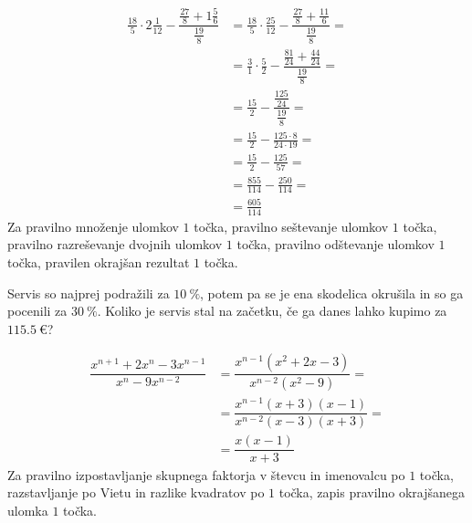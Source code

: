 \documentclass[addpoints]{exam}
\begin{document}
\begin{questions}
\begin{parts}
        \begin{solution}[7cm]
            \begin{align*} 
                \frac{18}{5}\cdot 2\frac{1}{12}-\dfrac{\frac{27}{8}+1\frac{5}{6}}{\frac{19}{8}}&=\frac{18}{5}\cdot \frac{25}{12}-\dfrac{\frac{27}{8}+\frac{11}{6}}{\frac{19}{8}}= \\
                                                                                            &= \frac{3}{1}\cdot \frac{5}{2}-\dfrac{\frac{81}{24}+\frac{44}{24}}{\frac{19}{8}}= \\
                                                                                            &=\frac{15}{2}-\dfrac{\frac{125}{24}}{\frac{19}{8}}= \\
                                                                                            &=\frac{15}{2}-\frac{125\cdot 8}{24\cdot 19}= \\
                                                                                            &=\frac{15}{2}-\frac{125}{57}= \\
                                                                                            &=\frac{855}{114}-\frac{250}{114}= \\
                                                                                            &=\frac{605}{114}
            \end{align*}
            Za pravilno množenje ulomkov $1$ točka, pravilno seštevanje ulomkov $1$ točka, pravilno razreševanje dvojnih ulomkov $1$ točka, pravilno odštevanje ulomkov $1$ točka, pravilen okrajšan rezultat $1$ točka.
        \end{solution}


    \end{parts}



        \question[3]
        Servis so najprej podražili za $10~\%$, potem pa se je ena skodelica okrušila in so
        ga pocenili za $30~\%$. Koliko je servis stal na začetku, če ga danes lahko kupimo za $115.5~\euro$?

        \begin{solution}[3cm]
            \begin{align*}
                \dfrac{x^{n+1}+2x^n-3x^{n-1}}{x^n-9x^{n-2}} &= \dfrac{x^{n-1}(x^{2}+2x-3)}{x^{n-2}(x^2-9)}= \\
                                                            &= \dfrac{x^{n-1}(x+3)(x-1)}{x^{n-2}(x-3)(x+3)}= \\
                                                            &= \dfrac{x(x-1)}{x+3}
            \end{align*}
            Za pravilno izpostavljanje skupnega faktorja v števcu in imenovalcu po $1$ točka, razstavljanje po Vietu in razlike kvadratov po $1$ točka, zapis pravilno okrajšanega ulomka $1$ točka.
        \end{solution}




\end{questions}
\end{document}
